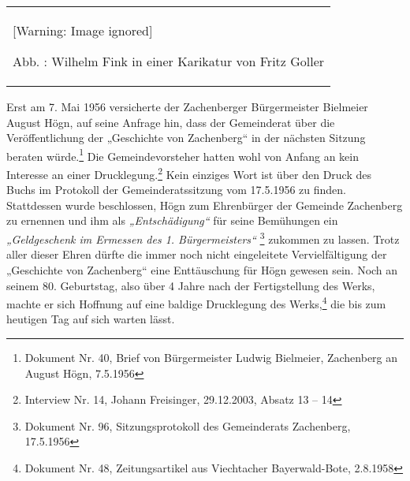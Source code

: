 \documentclass[a4paper]{article}
\newcommand\textstyleZitate[1]{\textit{#1}}
\newcommand\textstyleFootnoteSymbol[1]{\textsuperscript{#1}}
\newcounter{Abb}
\renewcommand\theAbb{\arabic{Abb}}
\begin{document}
\begin{center}
\begin{minipage}{5.812cm}
\begin{center}
\tablefirsthead{}
\tablehead{}
\tabletail{}
\tablelasttail{}
\begin{supertabular}{m{5.612cm}}
  [Warning: Image ignored] %
 
Abb. \stepcounter{Abb}{\theAbb}: Wilhelm Fink in einer Karikatur von
Fritz Goller\\
\end{supertabular}
\end{center}
\end{minipage}
\end{center}
Erst am 7. Mai 1956 versicherte der Zachenberger Bürgermeister Bielmeier
August Högn, auf seine Anfrage hin, dass der Gemeinderat über die
Veröffentlichung der „Geschichte von Zachenberg“ in der nächsten
Sitzung beraten würde.\footnote{ Dokument Nr. 40, Brief von
Bürgermeister Ludwig Bielmeier, Zachenberg an August Högn, 7.5.1956}
Die Gemeindevorsteher hatten wohl von Anfang an kein Interesse an einer
Drucklegung.\footnote{ Interview Nr. 14, Johann Freisinger, 29.12.2003,
Absatz 13 – 14} Kein einziges Wort ist über den Druck des Buchs im
Protokoll der Gemeinderatssitzung vom 17.5.1956 zu finden. Stattdessen
wurde beschlossen, Högn zum Ehrenbürger der Gemeinde Zachenberg zu
ernennen und ihm als \textstyleZitate{„Entschädigung“ }für seine
Bemühungen ein \textstyleZitate{„Geldgeschenk im Ermessen des 1.
Bürgermeisters“}\textstyleFootnoteSymbol{ }\footnote{ Dokument Nr. 96,
Sitzungsprotokoll des Gemeinderats Zachenberg, 17.5.1956} zukommen zu
lassen. Trotz aller dieser Ehren dürfte die immer noch nicht
eingeleitete Vervielfältigung der „Geschichte von Zachenberg“ eine
Enttäuschung für Högn gewesen sein. Noch an seinem 80. Geburtstag, also
über 4 Jahre nach der Fertigstellung des Werks, machte er sich Hoffnung
auf eine baldige Drucklegung des Werks,\footnote{ Dokument Nr. 48,
Zeitungsartikel aus Viechtacher Bayerwald-Bote, 2.8.1958} die bis zum
heutigen Tag auf sich warten lässt.
\end{document}
